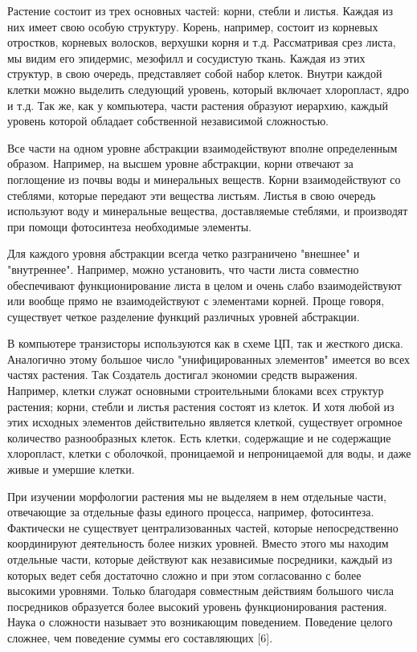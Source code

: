 \documentclass[11pt]{article}
\begin{document}
Растение состоит из трех основных частей: корни, стебли и листья. Каждая из них имеет свою особую структуру. Корень, например, состоит из корневых отростков, корневых волосков, верхушки корня и т.д. Рассматривая срез листа, мы видим его эпидермис, мезофилл и сосудистую ткань. Каждая из этих структур, в свою очередь, представляет собой набор клеток. Внутри каждой клетки можно выделить следующий уровень, который включает хлоропласт, ядро и т.д. Так же, как у компьютера, части растения образуют иерархию, каждый уровень которой обладает собственной независимой сложностью. \par
Все части на одном уровне абстракции взаимодействуют вполне определенным образом. Например, на высшем уровне абстракции, корни отвечают за поглощение из почвы воды и минеральных веществ. Корни взаимодействуют со стеблями, которые передают эти вещества листьям. Листья в свою очередь используют воду и минеральные вещества, доставляемые стеблями, и производят при помощи фотосинтеза необходимые элементы. \par
Для каждого уровня абстракции всегда четко разграничено "внешнее" и "внутреннее". Например, можно установить, что части листа совместно обеспечивают функционирование листа в целом и очень слабо взаимодействуют или вообще прямо не взаимодействуют с элементами корней. Проще говоря, существует четкое разделение функций различных уровней абстракции. \par
В компьютере транзисторы используются как в схеме ЦП, так и жесткого диска. Аналогично этому большое число "унифицированных элементов" имеется во всех частях растения. Так Создатель достигал экономии средств выражения. Например, клетки служат основными строительными блоками всех структур растения; корни, стебли и листья растения состоят из клеток. И хотя любой из этих исходных элементов действительно является клеткой, существует огромное количество разнообразных клеток. Есть клетки, содержащие и не содержащие хлоропласт, клетки с оболочкой, проницаемой и непроницаемой для воды, и даже живые и умершие клетки.\par 
При изучении морфологии растения мы не выделяем в нем отдельные части, отвечающие за отдельные фазы единого процесса, например, фотосинтеза. Фактически не существует централизованных частей, которые непосредственно координируют деятельность более низких уровней. Вместо этого мы находим отдельные части, которые действуют как независимые посредники, каждый из которых ведет себя достаточно сложно и при этом согласованно с более высокими уровнями. Только благодаря совместным действиям большого числа посредников образуется более высокий уровень функционирования растения. Наука о сложности называет это возникающим поведением. Поведение целого сложнее, чем поведение суммы его составляющих [6]. \par
\end{document}
